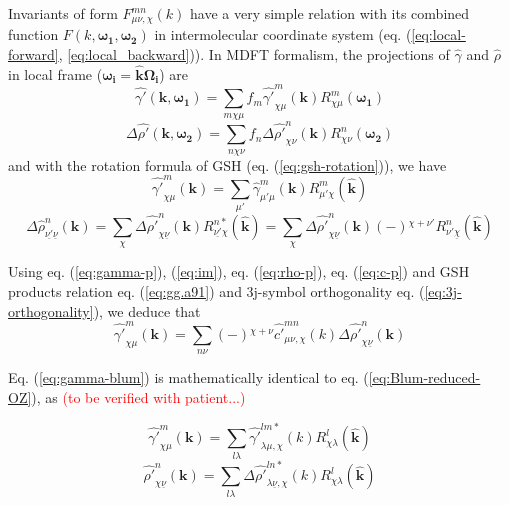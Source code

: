 Invariants of form $F_{\mu\nu,\chi}^{mn}(k)$ have a very simple relation
with its combined function $F(k,\boldsymbol{\omega_{1}},\boldsymbol{\omega_{2}})$
in intermolecular coordinate system (eq. (\ref{eq:local-forward},
\ref{eq:local_backward})). In MDFT formalism, the projections of
$\hat{\gamma}$ and $\hat{\rho}$ in local frame ($\boldsymbol{\omega_{i}}=\hat{\mathbf{k}}\mathbf{\Omega_{i}}$)
are
\begin{equation}
\hat{\gamma'}(\mathbf{k},\boldsymbol{\omega_{1}})=\sum_{m\chi\mu}f_{m}\hat{\gamma'}_{\chi\mu}^{m}(\mathbf{k})R_{\chi\mu}^{m}(\boldsymbol{\omega_{1}})\label{eq:gamma-projection-local}
\end{equation}
\begin{equation}
\Delta\hat{\rho'}(\mathbf{k},\boldsymbol{\omega_{2}})=\sum_{n\chi\nu}f_{n}\Delta\hat{\rho'}_{\chi\nu}^{n}(\mathbf{k})R_{\chi\nu}^{n}(\mathbf{\boldsymbol{\omega_{2}}})\label{eq:delta-rho-projection-local}
\end{equation}
and with the rotation formula of GSH (eq. (\ref{eq:gsh-rotation})),
we have 
\begin{equation}
\hat{\gamma'}_{\chi\mu}^{m}(\mathbf{k})=\sum_{\mu'}\hat{\gamma}_{\mu'\mu}^{m}(\mathbf{k})R_{\mu'\chi}^{m}(\hat{\mathbf{k}})\label{eq:gamma-p}
\end{equation}
\begin{equation}
\Delta\hat{\rho}_{\underline{\nu'}\underline{\nu}}^{n}(\mathbf{k})=\sum_{\chi}\Delta\hat{\rho'}_{\chi\underline{\nu}}^{n}(\mathbf{k})R_{\underline{\nu'}\chi}^{n*}(\hat{\mathbf{k}})=\sum_{\chi}\Delta\hat{\rho'}_{\chi\underline{\nu}}^{n}(\mathbf{k})\left(-\right){}^{\chi+\nu'}R_{\nu'\underline{\chi}}^{n}(\hat{\mathbf{k}})\label{eq:rho-p}
\end{equation}


Using eq. (\ref{eq:gamma-p}), (\ref{eq:im}), eq. (\ref{eq:rho-p}),
eq. (\ref{eq:c-p}) and GSH products relation eq. (\ref{eq:gg.a91})
and 3j-symbol orthogonality eq. (\ref{eq:3j-orthogonality}), we deduce
that
\begin{equation}
\hat{\gamma'}_{\chi\mu}^{m}(\mathbf{k})=\sum_{n\nu}\left(-\right){}^{\chi+\nu}\hat{c'}_{\mu\nu,\chi}^{mn}(k)\Delta\hat{\rho'}_{\chi\underline{\nu}}^{n}(\mathbf{k})\label{eq:gamma-blum}
\end{equation}


Eq. (\ref{eq:gamma-blum}) is mathematically identical to eq. (\ref{eq:Blum-reduced-OZ}),
as \textcolor{red}{(to be verified with patient...)}

\begin{equation}
\hat{\gamma'}_{\chi\mu}^{m}(\mathbf{k})=\sum_{l\lambda}\hat{\gamma'}_{\lambda\mu,\chi}^{lm*}(k)R_{\chi\lambda}^{l}(\hat{\mathbf{k}})
\end{equation}
\begin{equation}
\hat{\rho'}_{\chi\underline{\nu}}^{n}(\mathbf{k})=\sum_{l\lambda}\Delta\hat{\rho'}_{\lambda\underline{\nu},\chi}^{ln*}(k)R_{\chi\lambda}^{l}(\hat{\mathbf{k}})
\end{equation}


